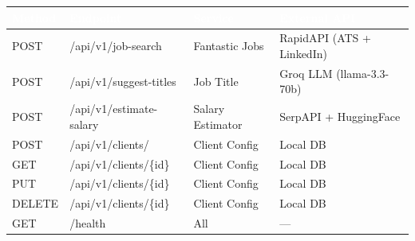 \documentclass[11pt, a4paper]{article}
\begin{document}
\begin{center}\small
\begin{tabularx}{\textwidth}{|C{1cm}|L{4cm}|L{3cm}|X|}
\hline
{}
\textcolor{white}{\textbf{Method}} & \textcolor{white}{\textbf{Endpoint}} & \textcolor{white}{\textbf{Service}} & \textcolor{white}{\textbf{External API}} \\
\hline
POST & /api/v1/job-search & Fantastic Jobs & RapidAPI (ATS + LinkedIn) \\
POST & /api/v1/suggest-titles & Job Title & Groq LLM (llama-3.3-70b) \\
POST & /api/v1/estimate-salary & Salary Estimator & SerpAPI + HuggingFace \\
POST & /api/v1/clients/ & Client Config & Local DB \\
GET & /api/v1/clients/\{id\} & Client Config & Local DB \\
PUT & /api/v1/clients/\{id\} & Client Config & Local DB \\
DELETE & /api/v1/clients/\{id\} & Client Config & Local DB \\
GET & /health & All & --- \\
\hline
\end{tabularx}
\end{center}
\end{document}
